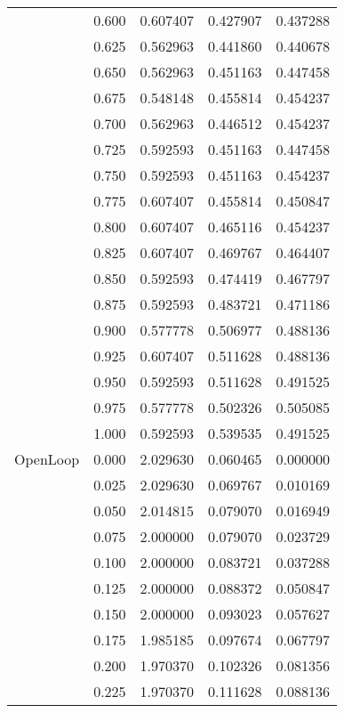 \begin{tabular}{llrrr}
         & 0.600 &   0.607407 &   0.427907 &   0.437288 \\
         & 0.625 &   0.562963 &   0.441860 &   0.440678 \\
         & 0.650 &   0.562963 &   0.451163 &   0.447458 \\
         & 0.675 &   0.548148 &   0.455814 &   0.454237 \\
         & 0.700 &   0.562963 &   0.446512 &   0.454237 \\
         & 0.725 &   0.592593 &   0.451163 &   0.447458 \\
         & 0.750 &   0.592593 &   0.451163 &   0.454237 \\
         & 0.775 &   0.607407 &   0.455814 &   0.450847 \\
         & 0.800 &   0.607407 &   0.465116 &   0.454237 \\
         & 0.825 &   0.607407 &   0.469767 &   0.464407 \\
         & 0.850 &   0.592593 &   0.474419 &   0.467797 \\
         & 0.875 &   0.592593 &   0.483721 &   0.471186 \\
         & 0.900 &   0.577778 &   0.506977 &   0.488136 \\
         & 0.925 &   0.607407 &   0.511628 &   0.488136 \\
         & 0.950 &   0.592593 &   0.511628 &   0.491525 \\
         & 0.975 &   0.577778 &   0.502326 &   0.505085 \\
         & 1.000 &   0.592593 &   0.539535 &   0.491525 \\
OpenLoop & 0.000 &   2.029630 &   0.060465 &   0.000000 \\
         & 0.025 &   2.029630 &   0.069767 &   0.010169 \\
         & 0.050 &   2.014815 &   0.079070 &   0.016949 \\
         & 0.075 &   2.000000 &   0.079070 &   0.023729 \\
         & 0.100 &   2.000000 &   0.083721 &   0.037288 \\
         & 0.125 &   2.000000 &   0.088372 &   0.050847 \\
         & 0.150 &   2.000000 &   0.093023 &   0.057627 \\
         & 0.175 &   1.985185 &   0.097674 &   0.067797 \\
         & 0.200 &   1.970370 &   0.102326 &   0.081356 \\
         & 0.225 &   1.970370 &   0.111628 &   0.088136 \\

\end{tabular}
